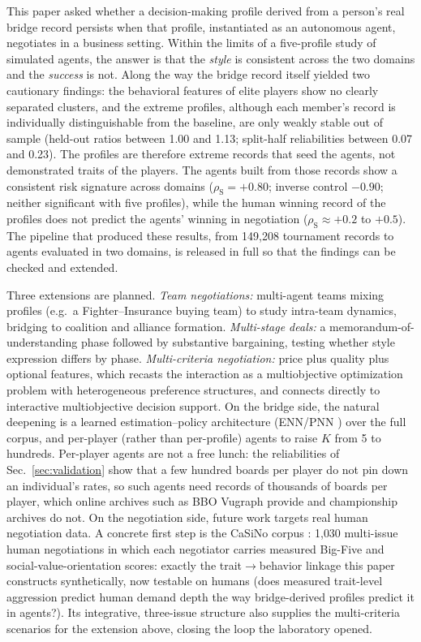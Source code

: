 \documentclass[11pt,a4paper]{article}
\newcommand{\rhoS}{\rho_{\mathrm{S}}}
\begin{document}
This paper asked whether a decision-making profile derived from a
person's real bridge record persists when that profile, instantiated
as an autonomous agent, negotiates in a business setting. Within the
limits of a five-profile study of simulated agents, the answer is that
the \emph{style} is consistent across the two domains and the
\emph{success} is not. Along the way the bridge record itself yielded
two cautionary findings: the behavioral features of elite players show
no clearly separated clusters, and the extreme profiles, although each
member's record is individually distinguishable from the baseline, are
only weakly stable out of sample (held-out ratios between 1.00 and
1.13; split-half reliabilities between 0.07 and 0.23). The profiles
are therefore extreme records that seed the agents, not demonstrated
traits of the players. The agents built from those records show a
consistent risk signature across domains ($\rhoS=+0.80$; inverse
control $-0.90$; neither significant with five profiles), while the
human winning record of the profiles does not predict the agents'
winning in negotiation ($\rhoS\approx+0.2$ to $+0.5$). The pipeline
that produced these results, from 149{,}208 tournament records to
agents evaluated in two domains, is released in full so that the
findings can be checked and extended.

Three extensions are planned. \emph{Team negotiations:} multi-agent
teams mixing profiles (e.g.\ a Fighter--Insurance buying team) to study
intra-team dynamics, bridging to coalition and alliance formation.
\emph{Multi-stage deals:} a memorandum-of-understanding phase followed
by substantive bargaining, testing whether style expression differs by
phase. \emph{Multi-criteria negotiation:} price plus quality plus
optional features, which recasts the interaction as a multiobjective
optimization problem with heterogeneous preference structures, and connects directly to interactive multiobjective decision support.
On the bridge side, the natural deepening is a learned
estimation--policy architecture (ENN/PNN \cite{rong2019bridge}) over the
full corpus, and per-player (rather than per-profile) agents to raise
$K$ from 5 to hundreds. Per-player agents are not a free lunch: the
reliabilities of Sec.~\ref{sec:validation} show that a few hundred
boards per player do not pin down an individual's rates, so such
agents need records of thousands of boards per player, which online
archives such as BBO Vugraph provide and championship archives do not.
On the negotiation side, future work targets
real human negotiation data. A concrete first step is the CaSiNo corpus
\cite{chawla2021casino}: 1{,}030 multi-issue human negotiations in
which each negotiator carries measured Big-Five and social-value-orientation scores: exactly the trait$\to$behavior linkage this paper constructs
synthetically, now testable on humans (does measured trait-level
aggression predict human demand depth the way bridge-derived profiles
predict it in agents?). Its integrative, three-issue structure also
supplies the multi-criteria scenarios for the extension above, closing
the loop the laboratory opened.
\end{document}
